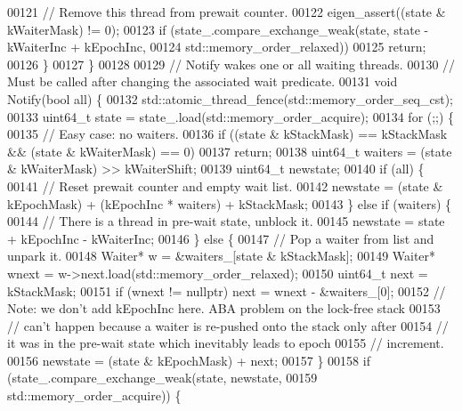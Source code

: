 \begin{DoxyCode}
{00121       \textcolor{comment}{// Remove this thread from prewait counter.}
00122       eigen\_assert((state & kWaiterMask) != 0);
00123       \textcolor{keywordflow}{if} (state\_.compare\_exchange\_weak(state, state - kWaiterInc + kEpochInc,
00124                                        std::memory\_order\_relaxed))
00125         \textcolor{keywordflow}{return};
00126     \}
00127   \}
00128 
00129   \textcolor{comment}{// Notify wakes one or all waiting threads.}
00130   \textcolor{comment}{// Must be called after changing the associated wait predicate.}
00131   \textcolor{keywordtype}{void} Notify(\textcolor{keywordtype}{bool} all) \{
00132     std::atomic\_thread\_fence(std::memory\_order\_seq\_cst);
00133     uint64\_t state = state\_.load(std::memory\_order\_acquire);
00134     \textcolor{keywordflow}{for} (;;) \{
00135       \textcolor{comment}{// Easy case: no waiters.}
00136       \textcolor{keywordflow}{if} ((state & kStackMask) == kStackMask && (state & kWaiterMask) == 0)
00137         \textcolor{keywordflow}{return};
00138       uint64\_t waiters = (state & kWaiterMask) >> kWaiterShift;
00139       uint64\_t newstate;
00140       \textcolor{keywordflow}{if} (all) \{
00141         \textcolor{comment}{// Reset prewait counter and empty wait list.}
00142         newstate = (state & kEpochMask) + (kEpochInc * waiters) + kStackMask;
00143       \} \textcolor{keywordflow}{else} \textcolor{keywordflow}{if} (waiters) \{
00144         \textcolor{comment}{// There is a thread in pre-wait state, unblock it.}
00145         newstate = state + kEpochInc - kWaiterInc;
00146       \} \textcolor{keywordflow}{else} \{
00147         \textcolor{comment}{// Pop a waiter from list and unpark it.}
00148         Waiter* w = &waiters\_[state & kStackMask];
00149         Waiter* wnext = w->next.load(std::memory\_order\_relaxed);
00150         uint64\_t next = kStackMask;
00151         \textcolor{keywordflow}{if} (wnext != \textcolor{keyword}{nullptr}) next = wnext - &waiters\_[0];
00152         \textcolor{comment}{// Note: we don't add kEpochInc here. ABA problem on the lock-free stack}
00153         \textcolor{comment}{// can't happen because a waiter is re-pushed onto the stack only after}
00154         \textcolor{comment}{// it was in the pre-wait state which inevitably leads to epoch}
00155         \textcolor{comment}{// increment.}
00156         newstate = (state & kEpochMask) + next;
00157       \}
00158       \textcolor{keywordflow}{if} (state\_.compare\_exchange\_weak(state, newstate,
00159                                        std::memory\_order\_acquire)) \{
}
\end{DoxyCode}
